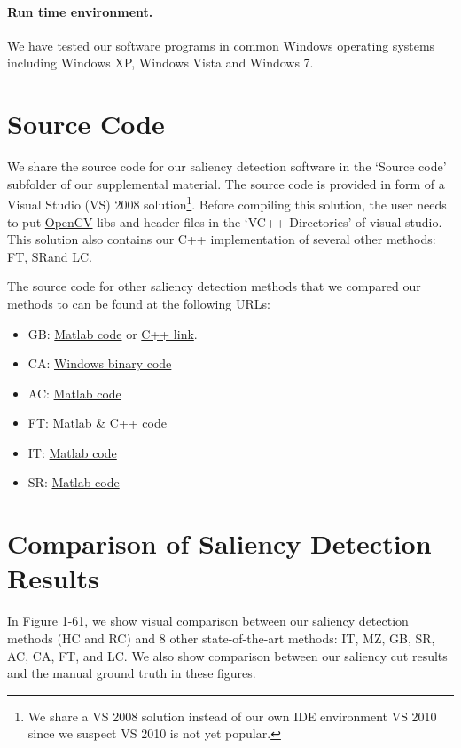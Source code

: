 \documentclass[10pt,twocolumn,letterpaper]{article}
\newcommand{\IT}{IT\cite{98pami/Itti}}
\newcommand{\MZ}{MZ\cite{03ACMMM/Ma_Contrast-based}}
\newcommand{\GB}{GB\cite{07ANIPS/harel_graph}}
\newcommand{\SR}{SR\cite{07cvpr/hou_SpectralResidual}}
\newcommand{\FT}{FT\cite{09cvpr/Achanta_FTSaliency}}
\newcommand{\CA}{CA\cite{10cvpr/goferman_context}}
\newcommand{\LC}{LC\cite{06acmmm/ZhaiS_spatiotemporal}}
\newcommand{\AC}{AC\cite{08cvs/achanta_salient}}
\begin{document}
\paragraph{Run time environment.} We have tested our software programs in common Windows operating systems including Windows XP, Windows Vista and Windows 7.


\section{Source Code}\label{sec:code}

We share the source code for our saliency detection software in the `Source code' subfolder of our supplemental material. The source code is provided in form of a Visual Studio (VS) 2008 solution\footnote{We share a VS 2008 solution instead of our own IDE environment VS 2010 since we suspect VS 2010 is not yet popular.}. Before compiling this solution, the user needs to put \href{http://opencv.willowgarage.com/wiki/}{OpenCV} libs and header files in the `VC++ Directories' of visual studio. This solution also contains our C++ implementation of several other methods: \FT, \SR and \LC.

The source code for other saliency detection methods that we compared our methods to can be found at the following URLs:

\begin{itemize}
  \item \GB: \href{http://www.klab.caltech.edu/~harel/share/gbvs.php}{Matlab code} or  \href{http://ilab.usc.edu/toolkit/}{C++ link}.
  \item \CA: \href{http://ivrg.epfl.ch/~achanta/SalientRegionDetection/SalientRegionDetection.html}{Windows binary code}
  \item \AC: \href{http://webee.technion.ac.il/labs/cgm/Computer-Graphics-Multimedia/Software/Saliency/Saliency.html}{Matlab code}
  \item \FT: \href{http://ivrg.epfl.ch/supplementary_material/RK_CVPR09/}{Matlab \& C++ code}
  \item \IT: \href{http://www.klab.caltech.edu/~harel/share/gbvs.php}{Matlab code}
  \item \SR: \href{http://www.its.caltech.edu/~xhou/}{Matlab code}
\end{itemize}

\section{Comparison of Saliency Detection Results}\label{sec:compare}
In Figure 1-61, we show visual comparison between our saliency
detection methods (HC and RC) and 8 other state-of-the-art methods: \IT, \MZ, \GB, \SR, \AC,
\CA, \FT, and \LC. We also show comparison between our saliency cut results and the manual ground truth in these figures.

{\small


}


\end{document}
